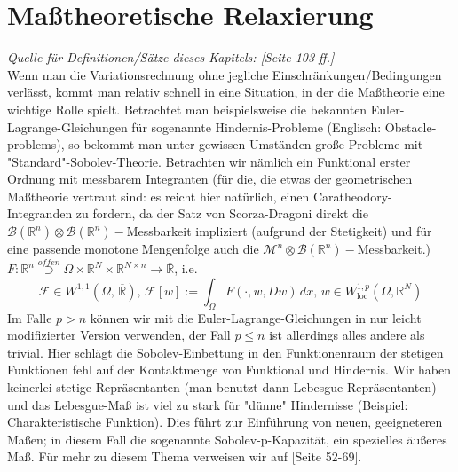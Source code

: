 \chapter{Maßtheoretische Relaxierung}
\textit{Quelle für Definitionen/Sätze dieses Kapitels: \cite{CalcVarBSchmidt}[Seite 103 ff.]}\\[0.1cm]
Wenn man die Variationsrechnung ohne jegliche Einschränkungen/Bedingungen verlässt, kommt man relativ schnell in eine Situation, in der die Maßtheorie eine wichtige Rolle spielt. Betrachtet man beispielsweise die bekannten Euler-Lagrange-Gleichungen für sogenannte Hindernis-Probleme (Englisch: Obstacle-problems), so bekommt man unter gewissen Umständen große Probleme mit "Standard"-Sobolev-Theorie. Betrachten wir nämlich ein Funktional erster Ordnung mit messbarem Integranten (für die, die etwas der geometrischen Maßtheorie vertraut sind: es reicht hier natürlich, einen Caratheodory-Integranden zu fordern, da der Satz von Scorza-Dragoni direkt die\\ \(\mathcal{B}(\mathbb{R}^n) \otimes \mathcal{B}(\mathbb{R}^n)-\)Messbarkeit impliziert (aufgrund der Stetigkeit) und für eine passende monotone Mengenfolge auch die \(\mathcal{M}^n \otimes \mathcal{B}(\mathbb{R}^n)-\)Messbarkeit.) \\ \(F:\mathbb{R}^n \stackrel{offen}{\supset} \Omega \times \mathbb{R}^N \times \mathbb{R}^{N \times n} \to \overline{\mathbb{R}}\), i.e.
\begin{equation}
    \mathcal{F} \in W^{1,1}(\Omega,\, \overline{\mathbb{R}}),\,\mathcal{F}[w] := \int_{\Omega} F(\cdot,w,Dw)\,dx, \, w \in W^{1,p}_{\text{loc}} (\Omega, \mathbb{R}^N)
\end{equation}
Im Falle \(p > n\) können wir mit die Euler-Lagrange-Gleichungen in nur leicht modifizierter Version verwenden, der Fall \(p \le n\) ist allerdings alles andere als trivial. Hier schlägt die Sobolev-Einbettung in den Funktionenraum der stetigen Funktionen fehl auf der Kontaktmenge von Funktional und Hindernis. Wir haben keinerlei stetige Repräsentanten (man benutzt dann Lebesgue-Repräsentanten) und das Lebesgue-Maß ist viel zu stark für "dünne" Hindernisse (Beispiel: Charakteristische Funktion). Dies führt zur Einführung von neuen, geeigneteren Maßen; in diesem Fall die sogenannte Sobolev-p-Kapazität, ein spezielles äußeres Maß. Für mehr zu diesem Thema verweisen wir auf \cite{CalcVar}[Seite 52-69].\\

